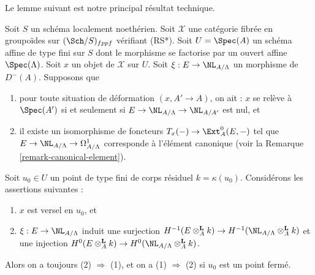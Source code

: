 \noindent
Le lemme suivant est notre principal résultat technique.

\begin{lemma}
\label{lemma-characterize-versal}
Soit $S$ un schéma localement noethérien. Soit $\mathcal{X}$ une catégorie
fibrée en groupoïdes sur $(\Sch/S)_{fppf}$ vérifiant (RS*).
Soit $U = \Spec(A)$ un
schéma affine de type fini sur $S$ dont le morphisme se factorise par un ouvert affine
$\Spec(\Lambda)$. Soit $x$ un objet de $\mathcal{X}$ sur $U$.
Soit $\xi : E \to \NL_{A/\Lambda}$ un morphisme de $D^{-}(A)$. Supposons que
\begin{enumerate}
\item[(i)] pour toute situation de déformation $(x, A' \to A)$, on ait :
$x$ se relève à $\Spec(A')$ si et seulement si
$E \to \NL_{A/\Lambda} \to \NL_{A/A'}$ est nul, et
\item[(ii)] il existe un isomorphisme de foncteurs
$T_x(-) \to \Ext^0_A(E, -)$
tel que $E \to \NL_{A/\Lambda} \to \Omega^1_{A/\Lambda}$
corresponde à l'élément canonique (voir la
Remarque \ref{remark-canonical-element}).
\end{enumerate}
Soit $u_0 \in U$ un point de type fini de corps résiduel
$k = \kappa(u_0)$. Considérons les assertions suivantes :
\begin{enumerate}
\item $x$ est versel en $u_0$, et
\item $\xi : E \to \NL_{A/\Lambda}$ induit une surjection
$H^{-1}(E \otimes_A^{\mathbf{L}} k) \to
H^{-1}(\NL_{A/\Lambda} \otimes_A^{\mathbf{L}} k)$
et une injection
$H^0(E \otimes_A^{\mathbf{L}} k) \to
H^0(\NL_{A/\Lambda} \otimes_A^{\mathbf{L}} k)$.
\end{enumerate}
Alors on a toujours (2) $\Rightarrow$ (1), et on a (1) $\Rightarrow$ (2)
si $u_0$ est un point fermé.
\end{lemma}

